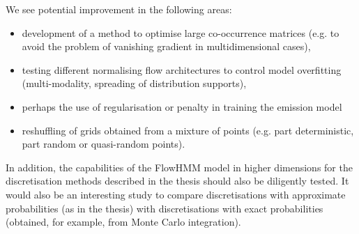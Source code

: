 \documentclass[shortabstract]{iithesis}
\begin{document}
We see potential improvement in the following areas:
\begin{itemize}
    \item development of a method to optimise large co-occurrence matrices (e.g. to avoid the problem of vanishing gradient in multidimensional cases),
    \item testing different normalising flow architectures to control model overfitting (multi-modality, spreading of distribution supports),
    \item perhaps the use of regularisation or penalty in training the emission model
    \item reshuffling of grids obtained from a mixture of points (e.g. part deterministic, part random or quasi-random points).
\end{itemize}
In addition, the capabilities of the FlowHMM model in higher dimensions for the discretisation methods described in the thesis should also be diligently tested. It would also be an interesting study to compare discretisations with approximate probabilities (as in the thesis) with discretisations with exact probabilities (obtained, for example, from Monte Carlo integration).











\end{document}
